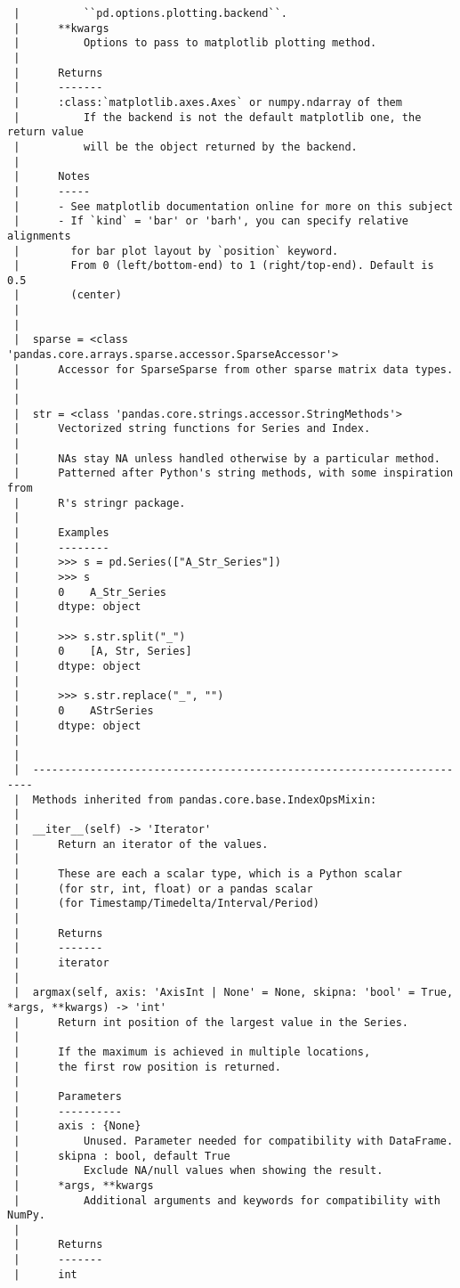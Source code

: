 \documentclass[
  letterpaper,
  DIV=11,
  numbers=noendperiod]{scrreprt}
\begin{document}
\begin{verbatim}
 |          ``pd.options.plotting.backend``.
 |      **kwargs
 |          Options to pass to matplotlib plotting method.
 |      
 |      Returns
 |      -------
 |      :class:`matplotlib.axes.Axes` or numpy.ndarray of them
 |          If the backend is not the default matplotlib one, the return value
 |          will be the object returned by the backend.
 |      
 |      Notes
 |      -----
 |      - See matplotlib documentation online for more on this subject
 |      - If `kind` = 'bar' or 'barh', you can specify relative alignments
 |        for bar plot layout by `position` keyword.
 |        From 0 (left/bottom-end) to 1 (right/top-end). Default is 0.5
 |        (center)
 |  
 |  
 |  sparse = <class 'pandas.core.arrays.sparse.accessor.SparseAccessor'>
 |      Accessor for SparseSparse from other sparse matrix data types.
 |  
 |  
 |  str = <class 'pandas.core.strings.accessor.StringMethods'>
 |      Vectorized string functions for Series and Index.
 |      
 |      NAs stay NA unless handled otherwise by a particular method.
 |      Patterned after Python's string methods, with some inspiration from
 |      R's stringr package.
 |      
 |      Examples
 |      --------
 |      >>> s = pd.Series(["A_Str_Series"])
 |      >>> s
 |      0    A_Str_Series
 |      dtype: object
 |      
 |      >>> s.str.split("_")
 |      0    [A, Str, Series]
 |      dtype: object
 |      
 |      >>> s.str.replace("_", "")
 |      0    AStrSeries
 |      dtype: object
 |  
 |  
 |  ----------------------------------------------------------------------
 |  Methods inherited from pandas.core.base.IndexOpsMixin:
 |  
 |  __iter__(self) -> 'Iterator'
 |      Return an iterator of the values.
 |      
 |      These are each a scalar type, which is a Python scalar
 |      (for str, int, float) or a pandas scalar
 |      (for Timestamp/Timedelta/Interval/Period)
 |      
 |      Returns
 |      -------
 |      iterator
 |  
 |  argmax(self, axis: 'AxisInt | None' = None, skipna: 'bool' = True, *args, **kwargs) -> 'int'
 |      Return int position of the largest value in the Series.
 |      
 |      If the maximum is achieved in multiple locations,
 |      the first row position is returned.
 |      
 |      Parameters
 |      ----------
 |      axis : {None}
 |          Unused. Parameter needed for compatibility with DataFrame.
 |      skipna : bool, default True
 |          Exclude NA/null values when showing the result.
 |      *args, **kwargs
 |          Additional arguments and keywords for compatibility with NumPy.
 |      
 |      Returns
 |      -------
 |      int

\end{verbatim}
\end{document}
